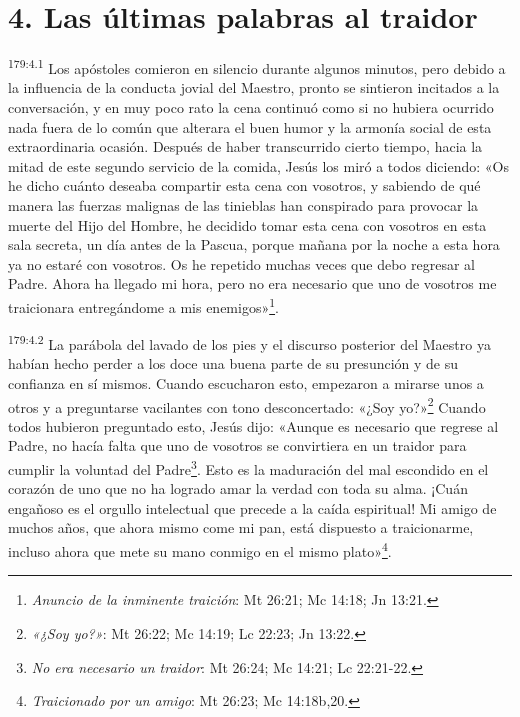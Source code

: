 \section*{4. Las últimas palabras al traidor}
\par 
\textsuperscript{179:4.1} Los apóstoles comieron en silencio durante algunos minutos, pero debido a la influencia de la conducta jovial del Maestro, pronto se sintieron incitados a la conversación, y en muy poco rato la cena continuó como si no hubiera ocurrido nada fuera de lo común que alterara el buen humor y la armonía social de esta extraordinaria ocasión. Después de haber transcurrido cierto tiempo, hacia la mitad de este segundo servicio de la comida, Jesús los miró a todos diciendo: «Os he dicho cuánto deseaba compartir esta cena con vosotros, y sabiendo de qué manera las fuerzas malignas de las tinieblas han conspirado para provocar la muerte del Hijo del Hombre, he decidido tomar esta cena con vosotros en esta sala secreta, un día antes de la Pascua, porque mañana por la noche a esta hora ya no estaré con vosotros. Os he repetido muchas veces que debo regresar al Padre. Ahora ha llegado mi hora, pero no era necesario que uno de vosotros me traicionara entregándome a mis enemigos»\footnote{\textit{Anuncio de la inminente traición}: Mt 26:21; Mc 14:18; Jn 13:21.}.

\par 
\textsuperscript{179:4.2} La parábola del lavado de los pies y el discurso posterior del Maestro ya habían hecho perder a los doce una buena parte de su presunción y de su confianza en sí mismos. Cuando escucharon esto, empezaron a mirarse unos a otros y a preguntarse vacilantes con tono desconcertado: «¿Soy yo?»\footnote{\textit{«¿Soy yo?»}: Mt 26:22; Mc 14:19; Lc 22:23; Jn 13:22.} Cuando todos hubieron preguntado esto, Jesús dijo: «Aunque es necesario que regrese al Padre, no hacía falta que uno de vosotros se convirtiera en un traidor para cumplir la voluntad del Padre\footnote{\textit{No era necesario un traidor}: Mt 26:24; Mc 14:21; Lc 22:21-22.}. Esto es la maduración del mal escondido en el corazón de uno que no ha logrado amar la verdad con toda su alma. ¡Cuán engañoso es el orgullo intelectual que precede a la caída espiritual! Mi amigo de muchos años, que ahora mismo come mi pan, está dispuesto a traicionarme, incluso ahora que mete su mano conmigo en el mismo plato»\footnote{\textit{Traicionado por un amigo}: Mt 26:23; Mc 14:18b,20.}.

